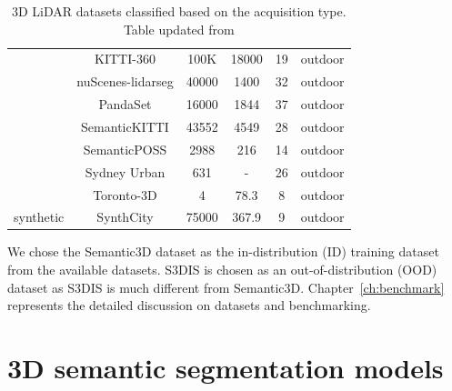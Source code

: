 \begin{table}[h!]
\begin{tabular}{c|c|c|c|c|c}
                                        & KITTI-360\cite{Xie_2016_CVPR_KITTI_360} & 100K & 18000 & 19 & outdoor\\ %
                                        & nuScenes-lidarseg\cite{caesar2020nuscenes} & 40000 & 1400 & 32& outdoor\\ %
                                        & PandaSet\cite{PandaSet} & 16000 & 1844 & 37 & outdoor \\ %
                                        & SemanticKITTI\cite{Behley_2019_ICCV} & 43552 & 4549 & 28 & outdoor \\ %
                                        & SemanticPOSS\cite{pan2020semanticposs} & 2988 & 216 & 14 & outdoor \\ %
                                        & Sydney Urban\cite{de2013unsupervised} & 631 & - & 26 & outdoor\\ %
                                        & Toronto-3D\cite{tan2020toronto3d} & 4 & 78.3& 8& outdoor\\ %
    
            \hline
            \multirow{1}{*}{synthetic}  & SynthCity\cite{griffiths2019synthcity} & 75000 & 367.9 & 9 & outdoor \\ %
            \hline
        \end{tabular}
        \caption{3D LiDAR datasets classified based on the acquisition type. Table updated from \cite{survey3d}}
        \label{table:3d_lidar_datasets_table}
    \end{table}
    
    We chose the Semantic3D dataset as the in-distribution (ID) training dataset from the available datasets. 
    S3DIS is chosen as an out-of-distribution (OOD) dataset as S3DIS is much different from Semantic3D.
    Chapter~\ref{ch:benchmark} represents the detailed discussion on datasets and benchmarking.

    \section{3D semantic segmentation models}

